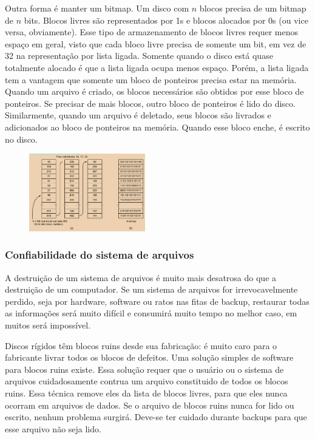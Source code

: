 \documentclass{article}
\begin{document}
Outra forma é manter um bitmap. Um disco com $n$ blocos precisa de um bitmap de $n$ bits. Blocos livres são representados por 1s e blocos alocados por 0s (ou vice versa, obviamente). Esse tipo de armazenamento de blocos livres requer menos espaço em geral, visto que cada bloco livre precisa de somente um bit, em vez de 32 na representação por lista ligada. Somente quando o disco está quase totalmente alocado é que a lista ligada ocupa menos espaço. Porém, a lista ligada tem a vantagem que somente um bloco de ponteiros precisa estar na memória. Quando um arquivo é criado, os blocos necessários são obtidos por esse bloco de ponteiros. Se precisar de mais blocos, outro bloco de ponteiros é lido do disco. Similarmente, quando um arquivo é deletado, seus blocos são livrados e adicionados ao bloco de ponteiros na memória. Quando esse bloco enche, é escrito no disco.

\begin{figure}[h]
  \begin{center}
    \includegraphics[width=0.45\textwidth]{img/5-18.png}
  \end{center}
  \caption{}
  \label{fig:}
\end{figure}

\subsubsection{Confiabilidade do sistema de arquivos}

A destruição de um sistema de arquivos é muito mais desatrosa do que a destruição de um computador. Se um sistema de arquivos for irrevocavelmente perdido, seja por hardware, software ou ratos nas fitas de backup, restaurar todas as informações será muito difícil e consumirá muito tempo no melhor caso, em muitos será impossível.

Discos rígidos têm blocos ruins desde sua fabricação: é muito caro para o fabricante livrar todos os blocos de defeitos. Uma solução simples de software para blocos ruins existe. Essa solução requer que o usuário ou o sistema de arquivos cuidadosamente contrua um arquivo constituido de todos os blocos ruins. Essa técnica remove eles da lista de blocos livres, para que eles nunca ocorram em arquivos de dados. Se o arquivo de blocos ruins nunca for lido ou escrito, nenhum problema surgirá. Deve-se ter cuidado durante backups para que esse arquivo não seja lido.
\end{document}

